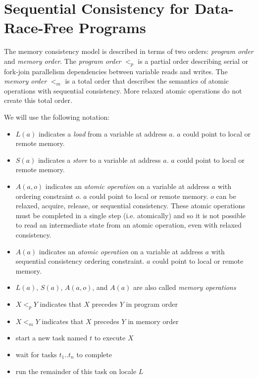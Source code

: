 \section{Sequential Consistency for Data-Race-Free Programs}
\label{SC_for_DRF}

The memory consistency model is described in terms of two orders:
\textit{program order} and \textit{memory order}. The \textit{program order}
$<_p$ is a partial order describing serial or fork-join parallelism
dependencies between variable reads and writes. The \textit{memory order} $<_m$
is a total order that describes the semantics of atomic operations with
sequential consistency. More relaxed atomic operations do not create this total
order.

We will use the following notation:
\begin{itemize}

  \item $L(a)$ indicates a \textit{load} from a variable at address $a$.  $a$
could point to local or remote memory.

  \item $S(a)$ indicates a \textit{store} to a variable at address $a$.  $a$
could point to local or remote memory.

  \item $A(a,o)$ indicates an \textit{atomic operation} on a variable at
address $a$ with ordering constraint $o$. $a$ could point to local or remote
memory.  $o$ can be relaxed, acquire, release, or sequential consistency. These
atomic operations must be completed in a single step (i.e. atomically) and so
it is not possible to read an intermediate state from an atomic operation, even
with relaxed consistency.

  \item $A(a)$ indicates an \textit{atomic operation} on a variable at address
$a$ with sequential consistency ordering constraint. $a$ could point to local
or remote memory.

  \item $L(a)$, $S(a)$, $A(a,o)$, and $A(a)$ are also called \textit{memory operations}
  \item $X <_p Y$ indicates that $X$ precedes $Y$ in program order
  \item $X <_m Y$ indicates that $X$ precedes $Y$ in memory order
  \item {} start a new task named $t$ to execute $X$
  \item {} wait for tasks $t_1..t_n$ to complete
  \item {} run the remainder of this task on locale $L$
\end{itemize}

